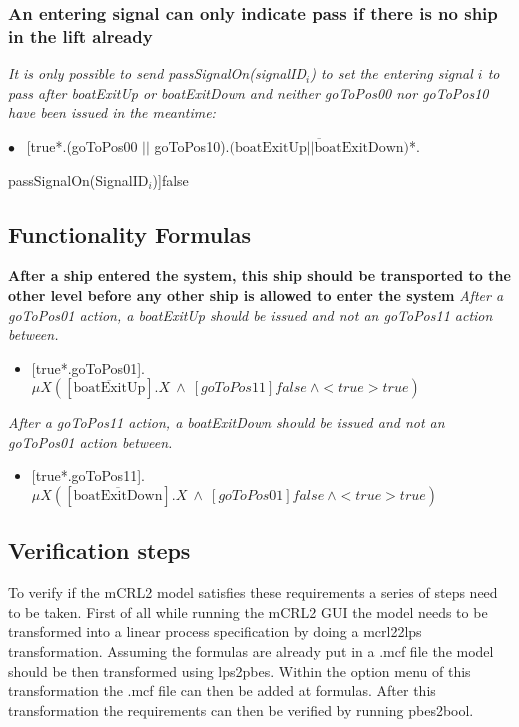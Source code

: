 \subsubsection{An entering signal can only indicate pass if there is no ship in the lift already}
\textit{It is only possible to send passSignalOn(signalID$_i$) to set the entering signal $i$ to pass after boatExitUp or boatExitDown and neither goToPos00 nor goToPos10 have been issued in the meantime:}\vspace{0.3cm}

	$\bullet$ ~[true*.(goToPos00 $||$ goToPos10).$\overline{\textrm{(boatExitUp} || \textrm{boatExitDown)}}$*.
		\begin{flushright}
			passSignalOn(SignalID$_i$)]false
		\end{flushright}
		
\subsection{Functionality Formulas}
\textbf{After a ship entered the system, this ship should be transported to the other level before any other ship is allowed to enter the system}
\textit{After a goToPos01 action, a boatExitUp should be issued and not an goToPos11 action between.}

\begin{itemize}
	\item $[$true*.goToPos01].$\mu X([\overline{\textrm{boatExitUp}}].X~\wedge~ [goToPos11]false~\wedge <true>true)$
\end{itemize}

\noindent\textit{After a goToPos11 action, a boatExitDown should be issued and not an goToPos01 action between.}

\begin{itemize}
	\item $[$true*.goToPos11].$\mu X([\overline{\textrm{boatExitDown}}].X~\wedge~ [goToPos01]false~\wedge <true>true)$
\end{itemize}

\subsection{Verification steps}
To verify if the mCRL2 model satisfies these requirements a series of steps need to be taken. First of all while running the mCRL2 GUI the model needs to be transformed into a linear process specification by doing a mcrl22lps transformation. Assuming the formulas are already put in a .mcf file the model should be then transformed using lps2pbes. Within the option menu of this transformation the .mcf file can then be added at formulas. After this transformation the requirements can then be verified by running pbes2bool.
\pagebreak
